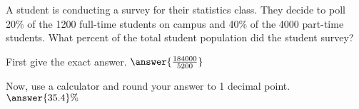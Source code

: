 \documentclass{ximera}
\author{David Kish}
\begin{document}
   \begin{exercise}
 A student is conducting a survey for their statistics class. They decide to poll 20\% of the 1200 full-time students on campus and 40\% of the 4000 part-time students.  What percent of the total student population did the student survey? 
 
First give the exact answer.  $\answer{\frac{184000}{5200}}$

Now, use a calculator and round your answer to 1 decimal point. $\answer{35.4}\%$ \calcHW
 \end{exercise}
\end{document}
